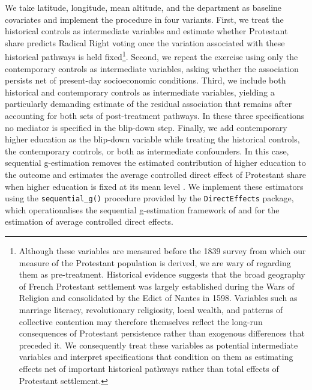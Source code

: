 \documentclass[12pt]{article}
\begin{document}
We take latitude, longitude, mean altitude, and the department as baseline covariates and implement the procedure in four variants. First, we treat the historical controls as intermediate variables and estimate whether Protestant share predicts Radical Right voting once the variation associated with these historical pathways is held fixed\footnote{Although these variables are measured before the 1839 survey from which our measure of the Protestant population is derived, we are wary of regarding them as pre-treatment. Historical evidence suggests that the broad geography of French Protestant settlement was largely established during the Wars of Religion and consolidated by the Edict of Nantes in 1598. Variables such as marriage literacy, revolutionary religiosity, local wealth, and patterns of collective contention may therefore themselves reflect the long-run consequences of Protestant persistence rather than exogenous differences that preceded it. We consequently treat these variables as potential intermediate variables and interpret specifications that condition on them as estimating effects net of important historical pathways rather than total effects of Protestant settlement.}. Second, we repeat the exercise using only the contemporary controls as intermediate variables, asking whether the association persists net of present-day socioeconomic conditions. Third, we include both historical and contemporary controls as intermediate variables, yielding a particularly demanding estimate of the residual association that remains after accounting for both sets of post-treatment pathways. In these three specifications no mediator is specified in the blip-down step. Finally, we add contemporary higher education as the blip-down variable while treating the historical controls, the contemporary controls, or both as intermediate confounders. In this case, sequential g-estimation removes the estimated contribution of higher education to the outcome and estimates the average controlled direct effect of Protestant share when higher education is fixed at its mean level \parencite{acharyaExplainingCausalFindings2016}. We implement these estimators using the \texttt{sequential\_g()} procedure provided by the \texttt{DirectEffects} package, which operationalises the sequential g-estimation framework of \textcite{vansteelandtEstimatingDirectEffects2009} and \textcite{acharyaExplainingCausalFindings2016} for the estimation of average controlled direct effects.
\end{document}
